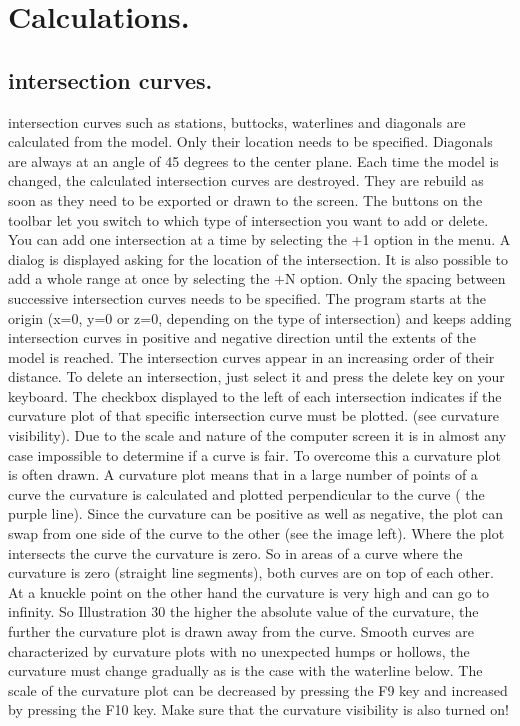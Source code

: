 \documentclass[12pt]{article}
\begin{document}
\section{Calculations.}

\subsection{intersection curves.}
intersection curves such as stations, buttocks, waterlines and
diagonals are calculated from the model. Only their location needs to
be specified. Diagonals are always at an angle of 45 degrees to the
center plane. Each time the model is changed, the calculated
intersection curves are destroyed. They are rebuild as soon as they
need to be exported or drawn to the screen. The buttons on the
toolbar let you switch to which type of intersection you want to add or
delete. You can add one intersection at a time by selecting the +1
option in the menu. A dialog is displayed asking for the location of
the intersection. It is also possible to add a whole range at once by
selecting the +N option. Only the spacing between successive
intersection curves needs to be specified. The program starts at the
origin (x=0, y=0 or z=0, depending on the type of intersection) and
keeps adding intersection curves in positive and negative direction until the extents of the model is
reached. The intersection curves appear in an increasing order of their distance. To delete an
intersection, just select it and press the delete key on your keyboard.
The checkbox displayed to the left of each intersection indicates if the curvature plot of that specific
intersection curve must be plotted. (see curvature visibility). Due to the scale and nature of the
computer screen it is in almost any case impossible to determine if a curve is fair. To overcome this
a curvature plot is often drawn. A curvature plot
means that in a large number of points of a curve
the curvature is calculated and plotted
perpendicular to the curve ( the purple line). Since
the curvature can be positive as well as negative,
the plot can swap from one side of the curve to the
other (see the image left). Where the plot
intersects the curve the curvature is zero. So in
areas of a curve where the curvature is zero
(straight line segments), both curves are on top of
each other. At a knuckle point on the other hand
the curvature is very high and can go to infinity. So
Illustration 30
the higher the absolute value of the curvature, the
further the curvature plot is drawn away from the curve. Smooth curves are characterized by
curvature plots with no unexpected humps or hollows, the curvature must change gradually as is the
case with the waterline below. The scale of the curvature plot can be decreased by pressing the F9
key and increased by pressing the F10 key. Make sure that the curvature visibility is also turned on!
\end{document}
